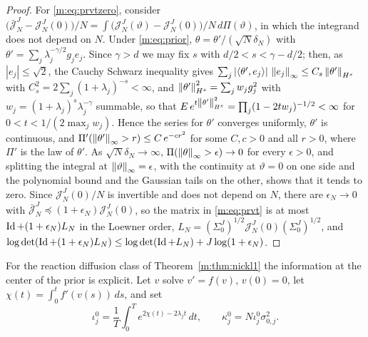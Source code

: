 \begin{proof}
For \eqref{m:eq:prvtzero}, consider $\big(\bar{\mathcal J}^J_N-\mathcal J^J_N(0)\big)/N=\int\big(\mathcal J^J_N(\vartheta)-\mathcal J^J_N(0)\big)/N\,d\Pi(\vartheta)$, in which the integrand does not depend on $N$. Under \eqref{m:eq:prior}, $\theta=\theta'/(\sqrt N\delta_N)$ with $\theta'=\sum_j\lambda_j^{-\gamma/2}g_je_j$. Since $\gamma>d$ we may fix $s$ with $d/2<s<\gamma-d/2$; then, as $|e_j|\le\sqrt2$, the Cauchy Schwarz inequality gives $\sum_j|\langle\theta',e_j\rangle|\,\left\|e_j\right\|_\infty\le C_s\left\|\theta'\right\|_{H^s}$ with $C_s^2=2\sum_j(1+\lambda_j)^{-s}<\infty$, and $\left\|\theta'\right\|^2_{H^s}=\sum_jw_jg_j^2$ with $w_j=(1+\lambda_j)^s\lambda_j^{-\gamma}$ summable, so that $E\,e^{t\left\|\theta'\right\|^2_{H^s}}=\prod_j(1-2tw_j)^{-1/2}<\infty$ for $0<t<1/(2\max_jw_j)$. Hence the series for $\theta'$ converges uniformly, $\theta'$ is continuous, and $\Pi'(\left\|\theta'\right\|_\infty>r)\le C\,e^{-cr^2}$ for some $C,c>0$ and all $r>0$, where $\Pi'$ is the law of $\theta'$. As $\sqrt N\delta_N\to\infty$, $\Pi(\left\|\theta\right\|_\infty>\epsilon)\to0$ for every $\epsilon>0$, and splitting the integral at $\left\|\vartheta\right\|_\infty=\epsilon$, with the continuity at $\vartheta=0$ on one side and the polynomial bound and the Gaussian tails on the other, shows that it tends to zero. Since $\mathcal J^J_N(0)/N$ is invertible and does not depend on $N$, there are $\epsilon_N\to0$ with $\bar{\mathcal J}^J_N\preceq(1+\epsilon_N)\mathcal J^J_N(0)$, so the matrix in \eqref{m:eq:prvt} is at most $\operatorname{Id}+(1+\epsilon_N)L_N$ in the Loewner order, $L_N=(\Sigma^J_0)^{1/2}\mathcal J^J_N(0)(\Sigma^J_0)^{1/2}$, and $\log\det(\operatorname{Id}+(1+\epsilon_N)L_N)\le\log\det(\operatorname{Id}+L_N)+J\log(1+\epsilon_N)$.
\end{proof}

For the reaction diffusion class of Theorem~\ref{m:thm:nickl1} the information at the center of the prior is explicit. Let $v$ solve $v'=f(v)$, $v(0)=0$, let $\chi(t)=\int_0^tf'(v(s))\,ds$, and set
\begin{equation}\label{m:eq:iotazero}
\iota^0_j=\frac1T\int_0^Te^{2\chi(t)-2\lambda_jt}\,dt,\qquad\kappa^0_j=N\iota^0_j\sigma^2_{0,j} .
\end{equation}

